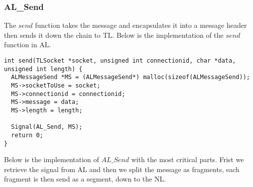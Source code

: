 \subsubsection{AL\_Send}
The $send$ function takes the message and encapsulates it into a message header then sends it down the chain to TL.
Below is the implementation of the $send$ function in AL.
\begin{lstlisting}
int send(TLSocket *socket, unsigned int connectionid, char *data, unsigned int length) {
  ALMessageSend *MS = (ALMessageSend*) malloc(sizeof(ALMessageSend));
  MS->socketToUse = socket;
  MS->connectionid = connectionid;
  MS->message = data;
  MS->length = length;

  Signal(AL_Send, MS);
  return 0;
}
\end{lstlisting}

Below is the implementation of $AL\_Send$ with the most critical parts.
Frist we retrieve the signal from AL and then we split the message as fragments,
each fragment is then send as a segment, down to the NL.
